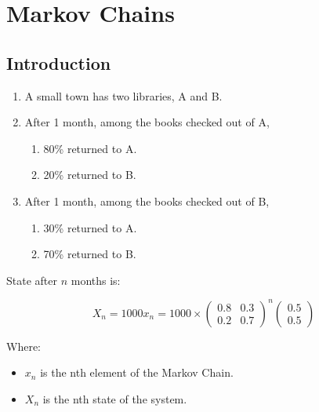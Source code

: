 \section{Markov Chains}
\subsection{Introduction}
\begin{enumerate}
    \item A small town has two libraries, A and B.
    \item After 1 month, among the books checked out of A,
        \begin{enumerate}
            \item 80\% returned to A.
            \item 20\% returned to B.
        \end{enumerate}
    \item After 1 month, among the books checked out of B,
        \begin{enumerate}
            \item 30\% returned to A.
            \item 70\% returned to B.
        \end{enumerate}    
\end{enumerate}

\noindent
State after \(n\) months is:

\begin{equation}
    X_n = 1000 x_n = 1000 \times \begin{pmatrix}
        0.8 & 0.3 \\ 0.2 & 0.7 
    \end{pmatrix}^n \begin{pmatrix}
        0.5 \\
        0.5
    \end{pmatrix}
\end{equation}

\noindent
Where:
\begin{itemize}
    \item \(x_n\) is the nth element of the Markov Chain.
    \item \(X_n\) is the nth state of the system.
\end{itemize}

